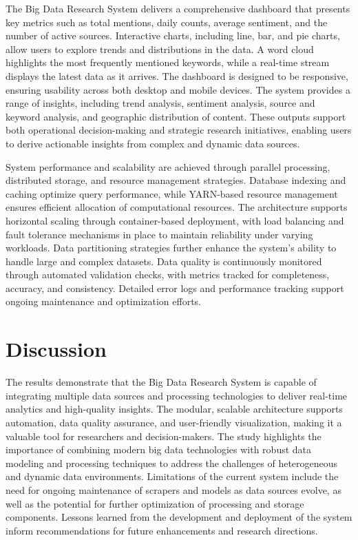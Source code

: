 \documentclass[a4paper]{article}
\theoremstyle{plain}
\theoremstyle{definition}
\begin{document}
The Big Data Research System delivers a comprehensive dashboard that presents key metrics such as total mentions, daily counts, average sentiment, and the number of active sources. Interactive charts, including line, bar, and pie charts, allow users to explore trends and distributions in the data. A word cloud highlights the most frequently mentioned keywords, while a real-time stream displays the latest data as it arrives. The dashboard is designed to be responsive, ensuring usability across both desktop and mobile devices. The system provides a range of insights, including trend analysis, sentiment analysis, source and keyword analysis, and geographic distribution of content. These outputs support both operational decision-making and strategic research initiatives, enabling users to derive actionable insights from complex and dynamic data sources.

System performance and scalability are achieved through parallel processing, distributed storage, and resource management strategies. Database indexing and caching optimize query performance, while YARN-based resource management ensures efficient allocation of computational resources. The architecture supports horizontal scaling through container-based deployment, with load balancing and fault tolerance mechanisms in place to maintain reliability under varying workloads. Data partitioning strategies further enhance the system's ability to handle large and complex datasets. Data quality is continuously monitored through automated validation checks, with metrics tracked for completeness, accuracy, and consistency. Detailed error logs and performance tracking support ongoing maintenance and optimization efforts.

\section{Discussion}

The results demonstrate that the Big Data Research System is capable of integrating multiple data sources and processing technologies to deliver real-time analytics and high-quality insights. The modular, scalable architecture supports automation, data quality assurance, and user-friendly visualization, making it a valuable tool for researchers and decision-makers. The study highlights the importance of combining modern big data technologies with robust data modeling and processing techniques to address the challenges of heterogeneous and dynamic data environments. Limitations of the current system include the need for ongoing maintenance of scrapers and models as data sources evolve, as well as the potential for further optimization of processing and storage components. Lessons learned from the development and deployment of the system inform recommendations for future enhancements and research directions.
\end{document}
